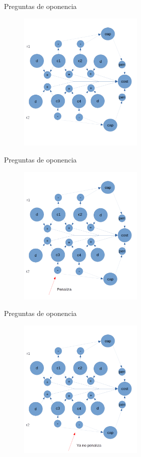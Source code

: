 \begin{frame}{Preguntas de oponencia}
	\onslide<1->\begin{figure}
		\includegraphics[width=6cm]{img/graph-1.png}
	\end{figure}
\end{frame}

\begin{frame}{Preguntas de oponencia}
	\onslide<1->\begin{figure}
		\includegraphics[width=6cm]{img/graph-2.png}
	\end{figure}
\end{frame}

\begin{frame}{Preguntas de oponencia}
	\onslide<1->\begin{figure}
		\includegraphics[width=6cm]{img/graph-3.png}
	\end{figure}
\end{frame}



